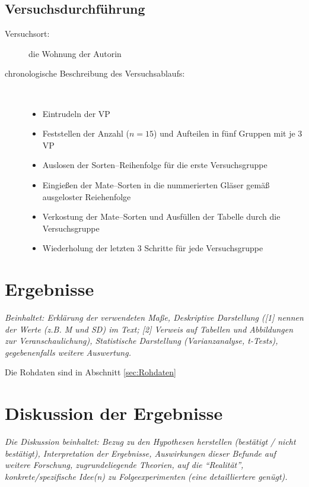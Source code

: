 \documentclass[11pt,a4paper,ngerman]{article}
\begin{document}
\subsection{Versuchsdurchführung} 
\begin{description}
 \item[Versuchsort:] die Wohnung der Autorin
 \item[chronologische Beschreibung des Versuchsablaufs:]~
  \begin{itemize}[label=-]
   \item Eintrudeln der VP
   \item Feststellen der Anzahl ($n=15$) und Aufteilen in fünf Gruppen mit je 3 VP
   \item Auslosen der Sorten--Reihenfolge für die erste Versuchsgruppe
   \item Eingießen der Mate--Sorten in die nummerierten Gläser gemäß ausgeloster Reiehenfolge
   \item Verkostung der Mate--Sorten und Ausfüllen der Tabelle durch die Versuchsgruppe
   \item Wiederholung der letzten 3 Schritte für jede Versuchsgruppe
  \end{itemize}
\end{description}




\section{Ergebnisse}%
\emph{Beinhaltet: Erklärung der verwendeten Maße, Deskriptive Darstellung ([1] nennen der Werte (z.B. \textit{M} und \textit{SD}) im Text; [2] Verweis auf Tabellen und Abbildungen zur Veranschaulichung), Statistische Darstellung (Varianzanalyse, t-Tests), gegebenenfalls weitere Auswertung. }

Die Rohdaten sind in Abschnitt \ref{sec:Rohdaten}


\section{Diskussion der Ergebnisse}%
\emph{Die Diskussion beinhaltet: Bezug zu den Hypothesen herstellen (bestätigt / nicht bestätigt), Interpretation der Ergebnisse, Auswirkungen dieser Befunde auf weitere Forschung, zugrundeliegende Theorien, auf die "`Realität"', konkrete/spezifische Idee(n) zu Folgeexperimenten (eine detailliertere genügt).}
\end{document}
